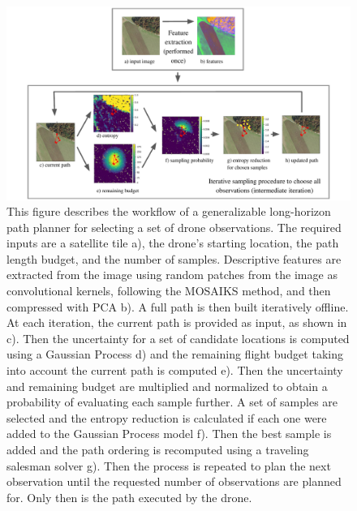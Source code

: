 \begin{figure}
    \centering
    \includegraphics[width=\textwidth, clip, trim={1.5cm, 0, 1.5cm, 0}]{figs/methods/IPP/RAPTORS_concept_figure.pdf}
    \caption{This figure describes the workflow of a generalizable long-horizon path planner for selecting a set of drone observations. The required inputs are a satellite tile a), the drone's starting location, the path length budget, and the number of samples. Descriptive features are extracted from the image using random patches from the image as convolutional kernels, following the MOSAIKS method, and then compressed with PCA b). A full path is then built iteratively offline. At each iteration, the current path is provided as input, as shown in c). Then the uncertainty for a set of candidate locations is computed using a Gaussian Process d) and the remaining flight budget taking into account the current path is computed e). Then the uncertainty and remaining budget are multiplied and normalized to obtain a probability of evaluating each sample further. A set of samples are selected and the entropy reduction is calculated if each one were added to the Gaussian Process model f). Then the best sample is added and the path ordering is recomputed using a traveling salesman solver g). Then the process is repeated to plan the next observation until the requested number of observations are planned for. Only then is the path executed by the drone.
}
    \label{fig:methods:IPP_raptors_overview}
\end{figure}

%
%




